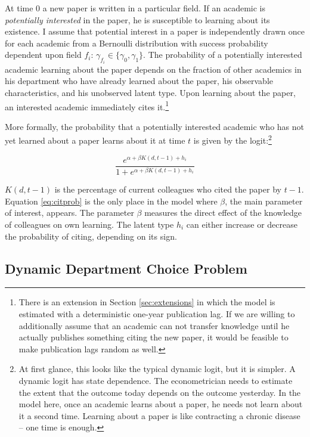 At time $0$ a new paper
is written in a particular field.  If an academic is \emph{potentially interested} in the
paper, he is susceptible to learning about its existence.
I assume that potential interest in a paper is independently drawn once for each
academic from a Bernoulli distribution with success probability dependent upon field $f_i$: 
$\gamma_{f_i} \in \{\gamma_0, \gamma_1\}$.
The probability of a potentially interested academic learning about the paper
depends on the fraction of
other academics in his department who have already learned about the paper,
his observable characteristics, and his unobserved latent type. Upon
learning about the paper, an interested academic immediately cites it.\footnote{There is an extension in Section \ref{sec:extensions} in which the model is estimated with a deterministic one-year publication lag.  If we are willing to additionally assume that an academic can not transfer knowledge until he actually publishes something citing the new paper, it would be feasible to make publication lags random as well.}

More formally, the probability that a potentially interested
academic who has not yet learned
about a paper learns about it at time $t$ is given by the
logit:\footnote{At first glance, this looks like the typical dynamic logit, but it is simpler.  A dynamic logit has state dependence.  The econometrician needs to estimate the extent that the outcome today depends on the outcome yesterday.  In the model here, once an academic learns about a paper, he needs not learn about it a second time.  Learning about a paper is like contracting a chronic disease -- one time is enough.}

\begin{equation}
    \frac{e^{\alpha + \beta K(d,t-1) + h_i}}{1 + e^{\alpha + \beta K(d,t-1) + h_i}}
    \label{eq:citprob}
\end{equation}

$K(d,t-1)$ is the percentage of current colleagues who cited the
paper by $t-1$. Equation \eqref{eq:citprob} is the only place in the
model where $\beta$, the main parameter of interest, appears. The
parameter $\beta$ measures the direct effect of the knowledge of colleagues on own
learning. The latent type $h_i$ can either increase or decrease the
probability of citing, depending on its sign.

\subsection{Dynamic Department Choice Problem}

